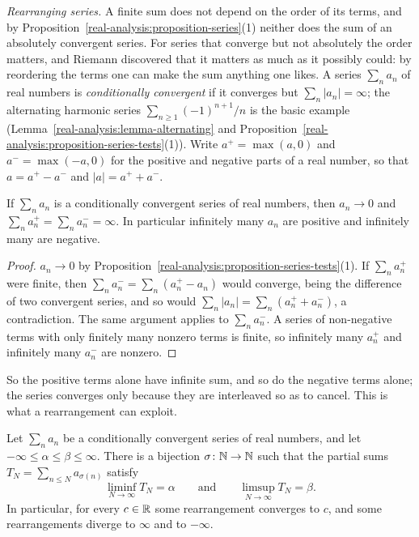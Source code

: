 \emph{Rearranging series.} A finite sum does not depend on the order of its terms, and by Proposition~\ref{real-analysis:proposition-series}(1) neither does the sum of an absolutely convergent
series. For series that converge but not absolutely the order matters, and Riemann discovered that it matters as much as it possibly could: by reordering the terms one can make the sum anything
one likes. A series $\sum_na_n$ of real numbers is \emph{conditionally convergent} if it converges but $\sum_n|a_n| = \infty$; the alternating harmonic series $\sum_{n \geq 1}(-1)^{n+1}/n$ is the basic
example (Lemma~\ref{real-analysis:lemma-alternating} and Proposition~\ref{real-analysis:proposition-series-tests}(1)). Write $a^+ = \max(a, 0)$ and $a^- = \max(-a, 0)$ for the positive and negative parts
of a real number, so that $a = a^+ - a^-$ and $|a| = a^+ + a^-$.

\begin{lemma}\label{real-analysis:lemma-conditional-parts}
If $\sum_na_n$ is a conditionally convergent series of real numbers, then $a_n \to 0$ and $\sum_na_n^+ = \sum_na_n^- = \infty$. In particular infinitely many $a_n$ are positive and infinitely
many are negative.
\end{lemma}

\begin{proof}
$a_n \to 0$ by Proposition~\ref{real-analysis:proposition-series-tests}(1). If $\sum_na_n^+$ were finite, then $\sum_na_n^- = \sum_n(a_n^+ - a_n)$ would converge, being the difference of two
convergent series, and so would $\sum_n|a_n| = \sum_n(a_n^+ + a_n^-)$, a contradiction. The same argument applies to $\sum_na_n^-$. A series of non-negative terms with only finitely many nonzero
terms is finite, so infinitely many $a_n^+$ and infinitely many $a_n^-$ are nonzero.
\end{proof}

So the positive terms alone have infinite sum, and so do the negative terms alone; the series converges only because they are interleaved so as to cancel. This is what a rearrangement can
exploit.

\begin{theorem}\label{real-analysis:theorem-riemann-rearrangement}
Let $\sum_na_n$ be a conditionally convergent series of real numbers, and let $-\infty \leq \alpha \leq \beta \leq \infty$. There is a bijection $\sigma \colon \mathbb{N} \to \mathbb{N}$ such that the partial sums
$T_N = \sum_{n \leq N}a_{\sigma(n)}$ satisfy
\[
\liminf_{N \to \infty}T_N = \alpha \qquad\text{and}\qquad \limsup_{N \to \infty}T_N = \beta .
\]
In particular, for every $c \in \mathbb{R}$ some rearrangement converges to $c$, and some rearrangements diverge to $\infty$ and to $-\infty$.
\end{theorem}

